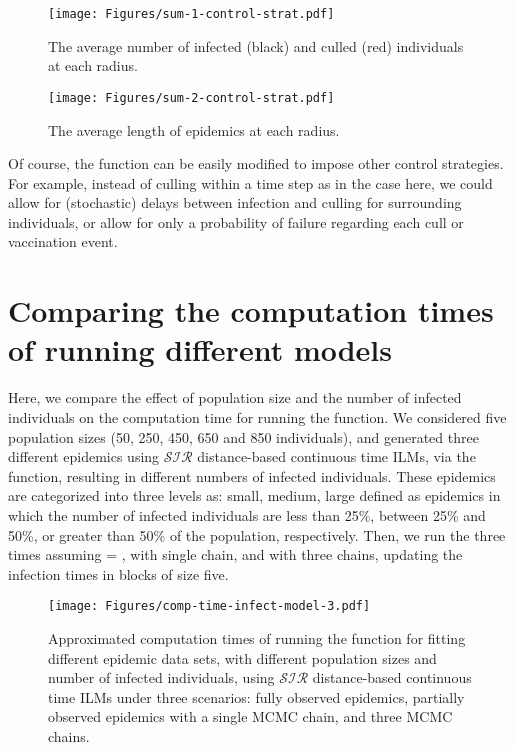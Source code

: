 \documentclass[nojss,shortnames]{jss}
\begin{document}
\begin{figure}[!ht]
\begin{center}
\texttt{[image: Figures/sum-1-control-strat.pdf]}
\caption{The average number of infected (black) and culled (red) individuals at each radius.}
\label{infec-culled}
\end{center}
\end{figure}

\begin{figure}[!h]
\begin{center}
\texttt{[image: Figures/sum-2-control-strat.pdf]}
\caption{The average length of epidemics at each radius.}
\label{length-epi}
\end{center}
\end{figure}

Of course, the  function can be easily modified to impose other control strategies. For example, instead of culling within a time step as in the case here, we could allow for (stochastic) delays between infection and culling for surrounding individuals, or allow for only a probability of failure regarding each cull or vaccination event.


\newpage

\section[D.]{Comparing the computation times of running different models}\label{appendix.4}

Here, we compare the effect of population size and the number of infected individuals on the computation time for running the  function. We considered five population sizes (50, 250, 450, 650 and 850 individuals), and generated three different epidemics using $\mathcal{SIR}$ distance-based continuous time ILMs, via the  function, resulting in different numbers of infected individuals. These epidemics are categorized into three levels as: small, medium, large defined as epidemics in which the number of infected individuals are less than 25\%, between 25\% and 50\%, or greater than 50\% of the population, respectively. Then, we run the  three times assuming  = ,  with single chain, and  with three chains, updating the infection times in blocks of size five. 

\begin{figure}[!h]
\begin{center}
\texttt{[image: Figures/comp-time-infect-model-3.pdf]}
\caption{Approximated computation times of running the  function for fitting different epidemic data sets, with different population sizes and number of infected individuals, using $\mathcal{SIR}$ distance-based continuous time ILMs under three scenarios: fully observed epidemics, partially observed epidemics with a single MCMC chain, and three MCMC chains.}
\label{comp-time-different}
\end{center}
\end{figure}
\end{document}
